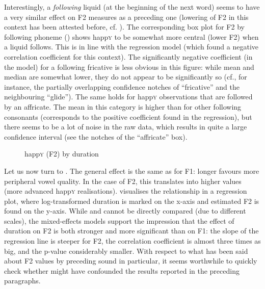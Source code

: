 Interestingly, a \emph{following} liquid (at the beginning of the next word) seems to have a very similar effect on F2 measures as a preceding one (lowering of F2 in this context has been attested before, cf. \citealt[26]{lehiste1964}).
The corresponding box plot for F2 by following phoneme () shows happ\textsc{y} to be somewhat more central (lower F2) when a liquid follows.
This is in line with the regression model (which found a negative correlation coefficient for this context).
The significantly negative coefficient (in the model) for a following fricative is less obvious in this figure: while mean and median are somewhat lower, they do not appear to be significantly so (cf., for instance, the partially overlapping confidence notches of ``fricative'' and the neighbouring ``glide'').
The same holds for happ\textsc{y} observations that are followed by an affricate.
The mean in this category is higher than for other following consonants (corresponds to the positive coefficient found in the regression), but there seems to be a lot of noise in the raw data, which results in quite a large confidence interval (see the notches of the ``affricate'' box).

\begin{figure}
	
		\resizebox{0.5\linewidth}{!}{} 
	\caption{happ\textsc{y} (F2) by duration}
	\label{fig.scatter.f2w.happy.dur}
\end{figure}

Let us now turn to .
The general effect is the same as for F1: longer  favours more peripheral vowel quality.
In the case of F2, this translates into higher values (more advanced happ\textsc{y} realisations).
 visualises the relationship in a regression plot, where log-transformed duration is marked on the x-axis and estimated F2 is found on the y-axis.
While  and  cannot be directly compared (due to different scales), the mixed-effects models support the impression that the effect of duration on F2 is both stronger and more significant than on F1: the slope of the regression line is steeper for F2, the correlation coefficient is almost three times as big, and the p-value considerably smaller.
With respect to what has been said about F2 values by preceding sound in particular, it seems worthwhile to quickly check whether  might have confounded the results reported in the preceding paragraphs.


